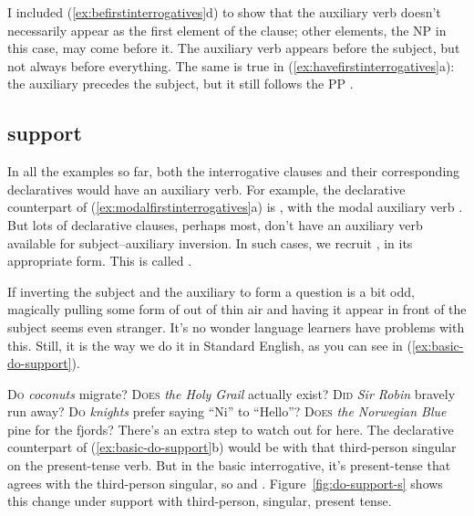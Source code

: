 I included (\ref{ex:befirstinterrogatives}d) to show that the auxiliary verb doesn't necessarily appear as the first element of the clause; other elements, the NP  in this case, may come before it. The auxiliary verb appears before the subject, but not always before everything. The same is true in (\ref{ex:havefirstinterrogatives}a): the auxiliary precedes the subject, but it still follows the PP .


\subsection{ support}\label{sec:basic-do-support}

In all the examples so far, both the interrogative clauses and their corresponding declaratives would have an auxiliary verb. For example, the declarative counterpart of (\ref{ex:modalfirstinterrogatives}a) is , with the modal auxiliary verb . But lots of declarative clauses, perhaps most, don't have an auxiliary verb available for subject--auxiliary inversion. In such cases, we recruit , in its appropriate form. This is called .

If inverting the subject and the auxiliary to form a question is a bit odd, magically pulling some form of  out of thin air and having it appear in front of the subject seems even stranger. It's no wonder language learners have problems with this. Still, it is the way we do it in Standard English, as you can see in (\ref{ex:basic-do-support}).


\ea \label{ex:basic-do-support}
    \ea \textsc{Do} \emph{coconuts} migrate?
        \ex \textsc{Does} \emph{the Holy Grail} actually exist?
        \ex \textsc{Did} \emph{Sir Robin} bravely run away?
        \ex \textsc{Do} \emph{knights} prefer saying \enquote{Ni} to \enquote{Hello}?
        \ex \textsc{Does} \emph{the Norwegian Blue} pine for the fjords?
    \z
\z
There's an extra step to watch out for here. The declarative counterpart of (\ref{ex:basic-do-support}b) would be  with that third-person singular  on the present-tense verb. But in the basic interrogative, it's present-tense  that agrees with the third-person singular, so  \rightarrow {} and  \rightarrow {}. Figure~\ref{fig:do-support-s} shows this change under  support with third-person, singular, present tense.

